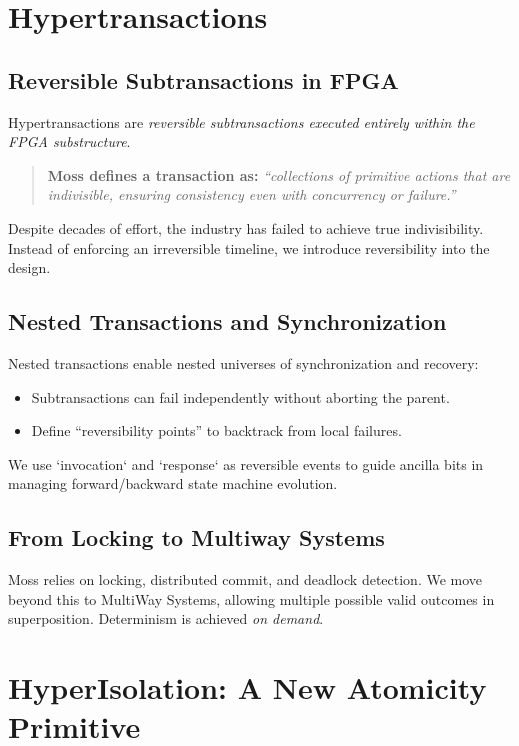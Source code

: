 \documentclass[../../../OAE-SPEC-MAIN.tex]{subfiles}
\begin{document}
\section{Hypertransactions}

\subsection{Reversible Subtransactions in FPGA}
Hypertransactions are \textit{reversible subtransactions executed entirely within the FPGA substructure}.

\begin{quote}
\textbf{Moss defines a transaction as:}
\textit{``collections of primitive actions that are indivisible, ensuring consistency even with concurrency or failure.''}
\end{quote}

Despite decades of effort, the industry has failed to achieve true indivisibility. Instead of enforcing an irreversible timeline, we introduce reversibility into the design.

\subsection{Nested Transactions and Synchronization}
Nested transactions enable nested universes of synchronization and recovery:
\begin{itemize}
  \item Subtransactions can fail independently without aborting the parent.
  \item Define ``reversibility points'' to backtrack from local failures.
\end{itemize}

We use `invocation` and `response` as reversible events to guide ancilla bits in managing forward/backward state machine evolution.

\subsection{From Locking to Multiway Systems}
Moss relies on locking, distributed commit, and deadlock detection. We move beyond this to MultiWay Systems, allowing multiple possible valid outcomes in superposition. Determinism is achieved \textit{on demand}.

\section{HyperIsolation: A New Atomicity Primitive}
\end{document}
